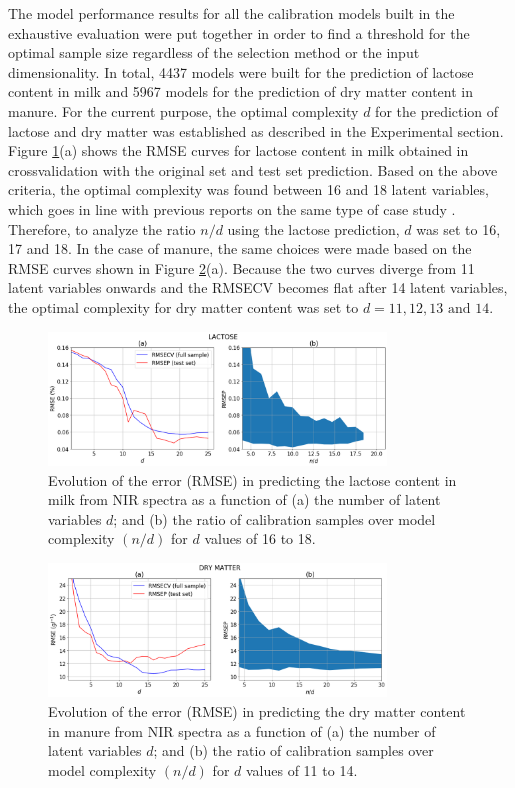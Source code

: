 \documentclass[preprint,12pt]{elsarticle}
\begin{document}
The model performance results for all the calibration models built in the exhaustive evaluation were put together in order to find a threshold for the optimal sample size regardless of the selection method or the input dimensionality. In total, 4437 models were built for the prediction of lactose content in milk and 5967 models for the prediction of dry matter content in manure. For the current purpose, the optimal complexity $d$ for the prediction of lactose and dry matter was established as described in the Experimental section. Figure \ref{fig_d01_milk_general_framework}(a) shows the RMSE curves for lactose content in milk obtained in crossvalidation with the original set and test set prediction. Based on the above criteria, the optimal complexity was found between 16 and 18 latent variables, which goes in line with previous reports on the same type of case study \cite{Diaz-Olivares2020}. Therefore, to analyze the ratio $n/d$ using the lactose prediction, $d$ was set to 16, 17 and 18. In the case of manure, the same choices were made based on the RMSE curves shown in Figure \ref{fig_d02_manure_general_framework}(a). Because the two curves diverge from 11 latent variables onwards and the RMSECV becomes flat after 14 latent variables, the optimal complexity for dry matter content was set to $d = 11,12,13 \text{ and } 14$\cite{Saeys2005}. 


\begin{figure}[H]
\includegraphics[width=0.8\textwidth]{manuscript/figures/d01_milk_general_framework.png}
\centering
\caption{Evolution of the error (RMSE) in predicting the lactose content in milk from NIR spectra as a function of (a) the number of latent variables $d$; and (b) the ratio of calibration samples over model complexity $(n/d)$ for $d$ values of 16 to 18.}
\label{fig_d01_milk_general_framework}
\end{figure}

\begin{figure}[H]
\includegraphics[width=0.8\textwidth]{manuscript/figures/d02_manure_general_framework.png}
\centering
\caption{Evolution of the error (RMSE) in predicting the dry matter content in manure from NIR spectra as a function of (a) the number of latent variables $d$; and (b) the ratio of calibration samples over model complexity $(n/d)$ for $d$ values of 11 to 14.}
\label{fig_d02_manure_general_framework}
\end{figure}
\end{document}
